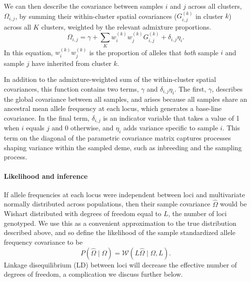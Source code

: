 \documentclass[12pt]{article}
\begin{document}
We can then describe the covariance between samples $i$ and $j$ across all clusters, $\Omega_{i,j}$,
by summing their within-cluster spatial covariances ($G_{i,j}^{(k)}$ in cluster $k$) across all $K$ clusters,
weighted by the relevant admixture proportions.
\begin{equation}
\Omega_{i,j} = \gamma + \sum\limits_K w^{(k)}_i w^{(k)}_j
G^{(k)}_{i,j} + \delta_{i,j}\eta_i .
\label{cross_cluster_covariance}
\end{equation}
In this equation, $w^{(k)}_i w^{(k)}_j$ is the proportion of alleles that \emph{both}
sample $i$ and sample $j$ have inherited from cluster $k$.

In addition to the admixture-weighted sum of the within-cluster spatial covariances,
this function contains two terms, $\gamma$ and $\delta_{i,j}\eta_i$.
The first, $\gamma$, describes the global covariance between all samples, 
and arises because all samples share an ancestral mean allele frequency at each locus,
which generates a base-line covariance.
In the final term, $\delta_{i,j}$ is an indicator variable that takes a value of 1 when $i$ equals $j$ and 0 otherwise,
and $\eta_i$ adds variance specific to sample $i$.
This term on the diagonal of the parametric covariance matrix captures processes shaping variance within the sampled deme, 
such as inbreeding and the sampling process.

\paragraph{Likelihood and inference}
If allele frequencies at each locus
were independent between loci and multivariate normally distributed across populations, 
then their sample covariance $\widehat{\Omega}$ 
would be Wishart distributed with degrees of freedom equal to $L$, 
the number of loci genotyped.
We use this as a convenient approximation to the true distribution described above,
and so define the likelihood of the sample standardized allele frequency covariance to be
\begin{equation}
P(\widehat{\Omega} \; | \; \Omega) = \mathcal{W} \left( L\widehat{\Omega} \; | \; \Omega,L\right) .
\end{equation}
Linkage disequilibrium (LD) between loci will decrease the effective number of degrees of freedom, 
a complication we discuss further below.
\end{document}
